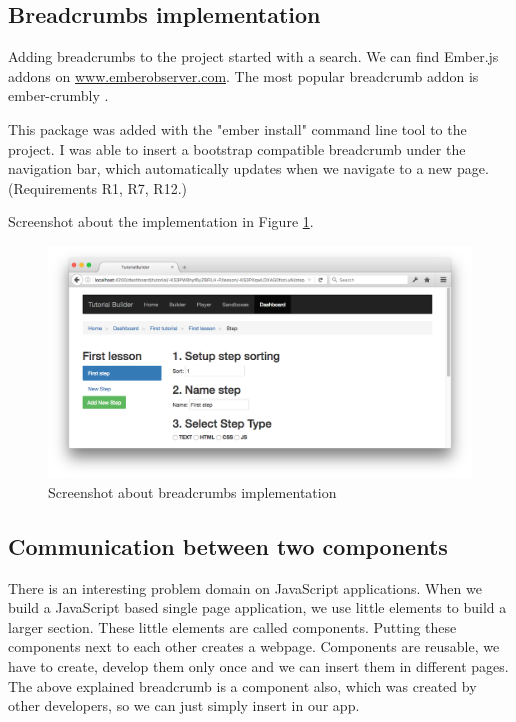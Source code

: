\documentclass[11pt, a4paper, oneside, openright, medskipamount]{report}
\begin{document}
\subsection{Breadcrumbs implementation} \label{breadcrumbs-implementation}

Adding breadcrumbs to the project started with a search. We can find Ember.js addons on \url{www.emberobserver.com}. The most popular breadcrumb addon is ember-crumbly \cite{ember-crumbly}.

This package was added with the "ember install" command line tool to the project. I was able to insert a bootstrap compatible breadcrumb under the navigation bar, which automatically updates when we navigate to a new page. (Requirements R1, R7, R12.)

Screenshot about the implementation in Figure \ref{fig:breadcrumb-screenshot}.

\begin{figure}[ht]
\centering
\includegraphics[width=1\textwidth]{assets/breadcrumb-screenshot.png}
\caption{Screenshot about breadcrumbs implementation}
\label{fig:breadcrumb-screenshot}
\end{figure}

\subsection{Communication between two components}

There is an interesting problem domain on JavaScript applications. When we build a JavaScript based single page application, we use little elements to build a larger section. These little elements are called components. Putting these components next to each other creates a webpage. Components are reusable, we have to create, develop them only once and we can insert them in different pages. The above explained breadcrumb is a component also, which was created by other developers, so we can just simply insert in our app.
\end{document}
